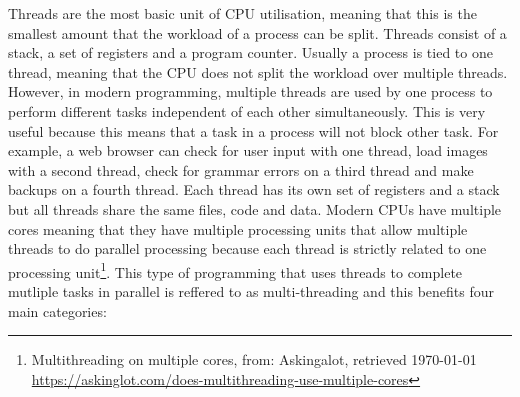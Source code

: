 Threads are the most basic unit of CPU utilisation, meaning that this is the smallest amount that the workload of a 
process can be split. Threads consist of a stack, a set of registers and a program counter. Usually a process
is tied to one thread, meaning that the CPU does not split the workload over multiple threads. However, in
modern programming, multiple threads are used by one process to perform different tasks independent of each other
simultaneously. This is very useful because this means that a task in a process will not block 
other task. For example, a web browser can check for user input with one thread, load images with a second thread,
check for grammar errors on a third thread and make backups on a fourth thread. Each thread has its own set of registers
and a stack but all threads share the same files, code and data. Modern CPUs have multiple cores meaning that they have
multiple processing units that allow multiple threads to do parallel processing because each thread is strictly
related to one processing unit\footnote{ Multithreading on multiple cores, from: Askingalot, retrieved \today\\ \url{https://askinglot.com/does-multithreading-use-multiple-cores} }. This type of programming that uses threads to complete mutliple tasks
in parallel is reffered to as multi-threading and this benefits four main categories:

